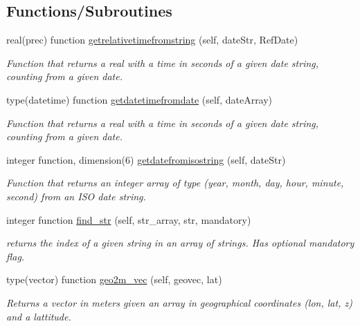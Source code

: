 \subsection*{Functions/\+Subroutines}
\begin{DoxyCompactItemize}
\item 
real(prec) function \mbox{\hyperlink{namespaceutilities__mod_a0dea0f7cb05b1a7c7c1da1d85a416b37}{getrelativetimefromstring}} (self, date\+Str, Ref\+Date)
\begin{DoxyCompactList}\small\item\em Function that returns a real with a time in seconds of a given date string, counting from a given date. \end{DoxyCompactList}\item 
type(datetime) function \mbox{\hyperlink{namespaceutilities__mod_a83ed7b458b5b642544fd59ce7473eb0c}{getdatetimefromdate}} (self, date\+Array)
\begin{DoxyCompactList}\small\item\em Function that returns a real with a time in seconds of a given date string, counting from a given date. \end{DoxyCompactList}\item 
integer function, dimension(6) \mbox{\hyperlink{namespaceutilities__mod_ab5b97f243f9347a40db76d55509d37ca}{getdatefromisostring}} (self, date\+Str)
\begin{DoxyCompactList}\small\item\em Function that returns an integer array of type (year, month, day, hour, minute, second) from an I\+SO date string. \end{DoxyCompactList}\item 
integer function \mbox{\hyperlink{namespaceutilities__mod_ad446cce78a6509db0e839439a0e84564}{find\+\_\+str}} (self, str\+\_\+array, str, mandatory)
\begin{DoxyCompactList}\small\item\em returns the index of a given string in an array of strings. Has optional mandatory flag. \end{DoxyCompactList}\item 
type(vector) function \mbox{\hyperlink{namespaceutilities__mod_a3d3d0e1568b178cd3e0bb8013642946c}{geo2m\+\_\+vec}} (self, geovec, lat)
\begin{DoxyCompactList}\small\item\em Returns a vector in meters given an array in geographical coordinates (lon, lat, z) and a lattitude. \end{DoxyCompactList}\item 

\end{DoxyCompactItemize}
